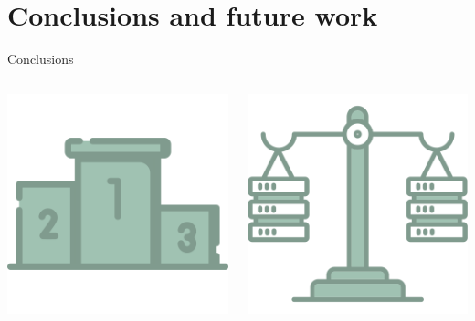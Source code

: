 \documentclass[9pt, pstricks, xcolor=dvipsnames]{beamer}
\begin{document}
\section{Conclusions and future work}
\frame{\insertsection}
\begin{frame}{Conclusions}

\begin{columns}
  \begin{column}{0.33\textwidth}
    \centering
    \includegraphics[scale=0.2]{images/podium.png}
    \pause
  \end{column}
  \begin{column}{0.33\textwidth}
    \centering
    \includegraphics[scale=0.2]{images/load-balancer.png}

\end{column}
\end{columns}
\end{frame}
\end{document}
